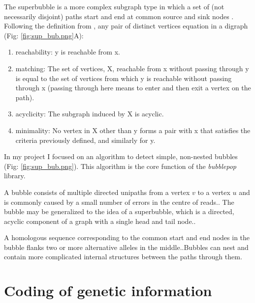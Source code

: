 The superbubble is a more complex subgraph type in which a set of (not necessarily disjoint) paths start and end at common source and sink nodes \cite{paten2018superbubbles}.
Following the definition from \cite{onodera2013detecting}, any pair of distinct vertices equation in a digraph (Fig: \ref{fig:sup_bub.png}A):
\begin{enumerate}
\item reachability: y is reachable from x.

\item matching: The set of vertices, X, reachable from x without passing through y is equal to the set of vertices from which y is reachable without passing through x (passing through here means to enter and then exit a vertex on the path).

\item acyclicity: The subgraph induced by X is acyclic.

\item minimality: No vertex in X other than y forms a pair with x that satisfies the criteria previously defined, and similarly for y.


\end{enumerate}

In my project I focused on an algorithm to detect simple, non-nested bubbles (Fig: \ref{fig:sup_bub.png}). This algorithm is the core function of the \textit{bubblepop} library.

A bubble consists of multiple directed unipaths from a vertex $v$ to a vertex $u$ and is commonly caused by a small number of errors in the centre of reads.\cite{brankovic2016linear}. The bubble may be generalized to the idea of a superbubble, which is a directed, acyclic component of a graph with a single head and tail node.\cite{onodera2013detecting}.

A homologous sequence corresponding to the common start
and end nodes in the bubble flanks two or more alternative alleles in the middle.\cite{garrison2019graphical}.Bubbles can nest and contain more complicated internal structures between the paths
through them. 

\section{Coding of genetic information}

